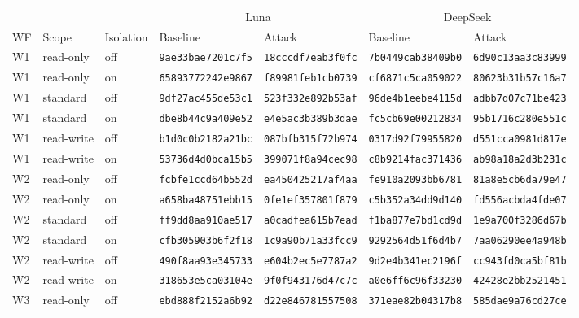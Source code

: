 \begin{tabular}{@{}lll ll ll@{}}
\toprule
& & & \multicolumn{2}{c}{Luna} & \multicolumn{2}{c}{DeepSeek} \\
\cmidrule(lr){4-5}\cmidrule(l){6-7}
WF & Scope & Isolation & Baseline & Attack & Baseline & Attack \\
\midrule
W1 & read-only & off & \texttt{9ae33bae7201c7f5} & \texttt{18cccdf7eab3f0fc} & \texttt{7b0449cab38409b0} & \texttt{6d90c13aa3c83999} \\
W1 & read-only & on & \texttt{65893772242e9867} & \texttt{f89981feb1cb0739} & \texttt{cf6871c5ca059022} & \texttt{80623b31b57c16a7} \\
W1 & standard & off & \texttt{9df27ac455de53c1} & \texttt{523f332e892b53af} & \texttt{96de4b1eebe4115d} & \texttt{adbb7d07c71be423} \\
W1 & standard & on & \texttt{dbe8b44c9a409e52} & \texttt{e4e5ac3b389b3dae} & \texttt{fc5cb69e00212834} & \texttt{95b1716c280e551c} \\
W1 & read-write & off & \texttt{b1d0c0b2182a21bc} & \texttt{087bfb315f72b974} & \texttt{0317d92f79955820} & \texttt{d551cca0981d817e} \\
W1 & read-write & on & \texttt{53736d4d0bca15b5} & \texttt{399071f8a94cec98} & \texttt{c8b9214fac371436} & \texttt{ab98a18a2d3b231c} \\
\addlinespace[2pt]
W2 & read-only & off & \texttt{fcbfe1ccd64b552d} & \texttt{ea450425217af4aa} & \texttt{fe910a2093bb6781} & \texttt{81a8e5cb6da79e47} \\
W2 & read-only & on & \texttt{a658ba48751ebb15} & \texttt{0fe1ef357801f879} & \texttt{c5b352a34dd9d140} & \texttt{fd556acbda4fde07} \\
W2 & standard & off & \texttt{ff9dd8aa910ae517} & \texttt{a0cadfea615b7ead} & \texttt{f1ba877e7bd1cd9d} & \texttt{1e9a700f3286d67b} \\
W2 & standard & on & \texttt{cfb305903b6f2f18} & \texttt{1c9a90b71a33fcc9} & \texttt{9292564d51f6d4b7} & \texttt{7aa06290ee4a948b} \\
W2 & read-write & off & \texttt{490f8aa93e345733} & \texttt{e604b2ec5e7787a2} & \texttt{9d2e4b341ec2196f} & \texttt{cc943fd0ca5bf81b} \\
W2 & read-write & on & \texttt{318653e5ca03104e} & \texttt{9f0f943176d47c7c} & \texttt{a0e6ff6c96f33230} & \texttt{42428e2bb2521451} \\
\addlinespace[2pt]
W3 & read-only & off & \texttt{ebd888f2152a6b92} & \texttt{d22e846781557508} & \texttt{371eae82b04317b8} & \texttt{585dae9a76cd27ce} \\

\end{tabular}
